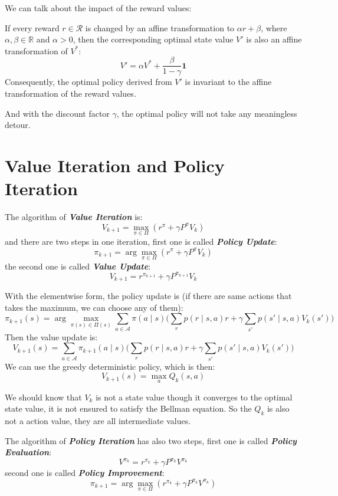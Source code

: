 \documentclass[10pt]{elegantbook}
\newcommand{\mydefination}[1]{\textbf{\textit{\textcolor{structurecolor}{#1}}}}
\begin{document}
We can talk about the impact of the reward values:
\begin{theorem}
    If every reward $r \in \mathcal R$ is changed by an affine transformation to $\alpha r + \beta$, where $\alpha, \beta \in \mathbb R$ and $\alpha > 0$, then
the corresponding optimal state value $V'$ is also an affine transformation of $V^*$:
\[ V' = \alpha V^* + \frac{\beta}{1 - \gamma} \mathbf{1} \]
Consequently, the optimal policy derived from $V'$ is invariant to the affine transformation of the reward values.
\end{theorem}

And with the discount factor $\gamma$, the optimal policy will not take any meaningless detour.

\section{Value Iteration and Policy Iteration}
The algorithm of \mydefination{Value Iteration} is:
\[ V_{k+1} = \max_{\pi \in \Pi} (r^{\pi} + \gamma P^{\pi}V_k) \]
and there are two steps in one iteration, first one is called \mydefination{Policy Update}:
\[ \pi_{k+1} = \arg\max_{\pi \in \Pi} (r^{\pi} + \gamma P^{\pi}V_k) \]
the second one is called \mydefination{Value Update}:
\[ V_{k+1} = r^{\pi_{k+1}} + \gamma P^{\pi_{k+1}}V_k \]

With the elementwise form, the policy update is (if there are same actions that takes the maximum, we can choose any of them):
\[ \pi_{k+1}(s) = \arg\max_{\pi(s) \in \Pi(s)} \sum_{a \in \mathcal A}\pi(a\mid s) \big ( \sum_r p(r \mid s, a) r + \gamma \sum_{s'}p(s' \mid s, a)V_k(s') \big ) \]
Then the value update is:
\[ V_{k+1}(s) = \sum_{a \in \mathcal A}\pi_{k+1}(a\mid s) \big ( \sum_r p(r \mid s, a) r + \gamma \sum_{s'}p(s' \mid s, a)V_k(s') \big ) \]
We can use the greedy deterministic policy, which is then:
\[ V_{k+1}(s) = \max_a Q_k(s, a) \]

We should know that $V_k$ is not a state value though it converges to the optimal state value, it is not ensured to satisfy the Bellman equation. So the 
$Q_k$ is also not a action value, they are all intermediate values.

The algorithm of \mydefination{Policy Iteration} has also two steps, first one is called \mydefination{Policy Evaluation}:
\[ V^{\pi_k} = r^{\pi_k} + \gamma P^{\pi_k}V^{\pi_k} \]
second one is called \mydefination{Policy Improvement}:
\[ \pi_{k+1} = \arg\max_{\pi \in \Pi} (r^{\pi_k} + \gamma P^{\pi_k}V^{\pi_k}) \]
\end{document}
